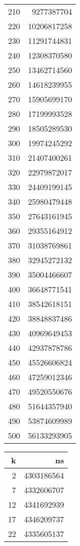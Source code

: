 \begin{figure}[H]
\begin{tabular}{r r}
        210 & 9277387704 \\
        220 & 10206817258 \\
        230 & 11291744831 \\
        240 & 12308370580 \\
        250 & 13462714560 \\
        260 & 14618239955 \\
        270 & 15905699170 \\
        280 & 17199993528 \\
        290 & 18505289530 \\
        300 & 19974245292 \\
        310 & 21407400261 \\
        320 & 22979872017 \\
        330 & 24409199145 \\
        340 & 25980479448 \\
        350 & 27643161945 \\
        360 & 29355164912 \\
        370 & 31038769861 \\
        380 & 32945272132 \\
        390 & 35004466607 \\
        400 & 36648771541 \\
        410 & 38542618151 \\
        420 & 38848837486 \\
        430 & 40969649453 \\
        440 & 42937878786 \\
        450 & 45526606824 \\
        460 & 47259012346 \\
        470 & 49520550676 \\
        480 & 51644357940 \\
        490 & 53874609989 \\
        500 & 56133293905 \\
        \bottomrule
    \end{tabular}
    \quad
    \begin{tabular}{r r}
        \toprule
        \textbf{k} & \textbf{ns} \\
        \midrule
        2 & 4303186564 \\
        7 & 4332606707 \\
        12 & 4341692939 \\
        17 & 4346209737 \\
        22 & 4335605137 \\

\end{tabular}
\end{figure}
